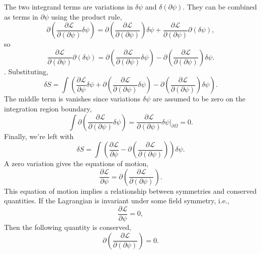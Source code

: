 The two integrand terms are variations in $\delta\psi$ and $\delta\left(\partial\psi\right)$. They can be combined as terms in $\partial\psi$ using the product rule,
\[
\partial\left(\frac{\partial \mathcal{L}}{\partial\left(\partial\psi\right)}\delta\psi\right) = \partial\left(\frac{\partial \mathcal{L}}{\partial\left(\partial\psi\right)}\right)\delta\psi +
\frac{\partial \mathcal{L}}{\partial\left(\partial\psi\right)}\partial\left(\delta\psi\right),
\]
so
\[
\frac{\partial \mathcal{L}}{\partial\left(\partial\psi\right)}\partial\left(\delta\psi\right) = \partial\left(\frac{\partial \mathcal{L}}{\partial\left(\partial\psi\right)}\delta\psi\right) -
\partial\left(\frac{\partial \mathcal{L}}{\partial\left(\partial\psi\right)}\right)\delta\psi. 
\].
Substituting,
\[
\delta S = \int \left(\frac{\partial\mathcal{L}}{\partial\psi}\delta\psi + \partial\left(\frac{\partial \mathcal{L}}{\partial\left(\partial\psi\right)}\delta\psi\right) -
\partial\left(\frac{\partial \mathcal{L}}{\partial\left(\partial\psi\right)}\right)\delta\psi\right). 
\]
The middle term is vanishes since variations $\delta\psi$ are assumed to be zero on the integration region boundary,
\[
\int \partial\left(\frac{\partial \mathcal{L}}{\partial\left(\partial\psi\right)}\delta\psi\right) = \frac{\partial \mathcal{L}}{\partial\left(\partial\psi\right)}\delta\psi \bigg\rvert_{\partial\Omega} = 0.
\]
Finally, we're left with
\[
\delta S = \int \left(\frac{\partial\mathcal{L}}{\partial\psi} -
\partial\left(\frac{\partial \mathcal{L}}{\partial\left(\partial\psi\right)}\right)\right)\delta\psi.
\]
A zero variation gives the equations of motion,
\[
\frac{\partial\mathcal{L}}{\partial\psi} =
\partial\left(\frac{\partial \mathcal{L}}{\partial\left(\partial\psi\right)}\right).
\]
This equation of motion implies a relationship between symmetries and conserved quantities. If the Lagrangian is invariant under some field symmetry, i.e.,
\[
\frac{\partial\mathcal{L}}{\partial\psi} = 0,
\]
Then the following quantity is conserved,
\[
\partial\left(\frac{\partial \mathcal{L}}{\partial\left(\partial\psi\right)}\right) = 0.
\]